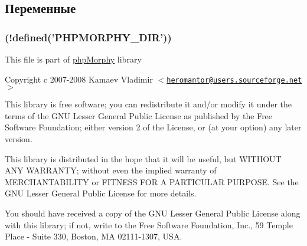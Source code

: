 \subsection{Переменные}
\hypertarget{common_8php_a2b282422028d1fe329c127a15d4f37c4}{
\subsubsection[{if}]{(!defined('PHPMORPHY\_\-DIR'))}}
\label{common_8php_a2b282422028d1fe329c127a15d4f37c4}
This file is part of \hyperlink{classphpMorphy}{phpMorphy} library

Copyright c 2007-\/2008 Kamaev Vladimir $<$\href{mailto:heromantor@users.sourceforge.net}{\tt heromantor@users.sourceforge.net}$>$

This library is free software; you can redistribute it and/or modify it under the terms of the GNU Lesser General Public License as published by the Free Software Foundation; either version 2 of the License, or (at your option) any later version.

This library is distributed in the hope that it will be useful, but WITHOUT ANY WARRANTY; without even the implied warranty of MERCHANTABILITY or FITNESS FOR A PARTICULAR PURPOSE. See the GNU Lesser General Public License for more details.

You should have received a copy of the GNU Lesser General Public License along with this library; if not, write to the Free Software Foundation, Inc., 59 Temple Place -\/ Suite 330, Boston, MA 02111-\/1307, USA. 